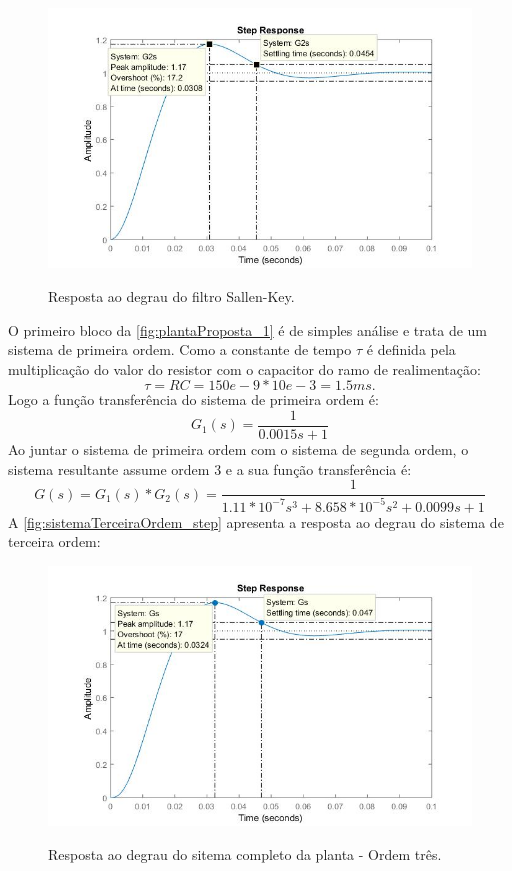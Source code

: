 \documentclass[
	article,			%
	11pt,				%
	oneside,			%
	a4paper,			%
	english,			%
	brazil,				%
	sumario=tradicional
	]{abntex2}
\begin{document}
\begin{figure}[htb!]
	\centering
	\caption{Resposta ao degrau do filtro Sallen-Key.}
	\includegraphics[scale=0.5]{./img/sallenKey_step.JPG}
	\label{fig:sallenKey_step}
\end{figure}

\pagebreak

O primeiro bloco da \autoref{fig:plantaProposta_1} é de simples análise e trata de um sistema de primeira ordem. 
Como a constante de tempo $\tau$ é definida pela multiplicação do valor do resistor com o capacitor do ramo de realimentação: 
$$\tau = RC = 150e-9 * 10e-3 = 1.5 ms.$$
Logo a função transferência do sistema de primeira ordem é:
$$
	G_{1}(s) = \frac{1}{0.0015s + 1}
$$
Ao juntar o sistema de primeira ordem com o sistema de segunda ordem, o sistema resultante assume ordem 3 e a sua função transferência é:
$$
	G(s) = G_{1}(s)*G_{2}(s) = \frac{1}{1.11*10^{-7} s^3 + 8.658*10^{-5} s^2 + 0.0099 s + 1}
$$
A \autoref{fig:sistemaTerceiraOrdem_step} apresenta a resposta ao degrau do sistema de terceira ordem:
\begin{figure}[htb!]
	\centering
	\caption{Resposta ao degrau do sitema completo da planta - Ordem três.}
	\includegraphics[scale=0.5]{./img/sistemaTerceiraOrdem_step.JPG}
	\label{fig:sistemaTerceiraOrdem_step}
\end{figure}
\end{document}
